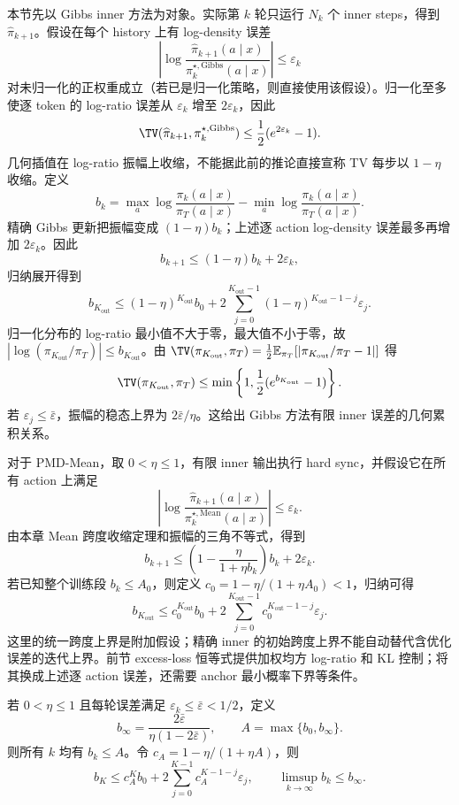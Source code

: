 本节先以 Gibbs inner 方法为对象。实际第 $k$ 轮只运行 $N_k$ 个 inner steps，得到 $\widehat\pi_{k+1}$。假设在每个 history 上有 log-density 误差
\[
 \left|\log\frac{\widehat\pi_{k+1}(a\mid x)}{\pi_k^{\star,\mathrm{Gibbs}}(a\mid x)}\right|\leq\varepsilon_k
\]
对未归一化的正权重成立（若已是归一化策略，则直接使用该假设）。归一化至多使逐 token 的 log-ratio 误差从 $\varepsilon_k$ 增至 $2\varepsilon_k$，因此
\begin{equation}\label{eq:finite-inner-tv}
 \TV(\widehat\pi_{k+1},\pi_k^{\star,\mathrm{Gibbs}})
 \leq \frac12(e^{2\varepsilon_k}-1).
\end{equation}
几何插值在 log-ratio 振幅上收缩，不能据此前的推论直接宣称 TV 每步以 $1-\eta$ 收缩。定义
\[
b_k=\max_a\log\frac{\pi_k(a\mid x)}{\pi_T(a\mid x)}
-\min_a\log\frac{\pi_k(a\mid x)}{\pi_T(a\mid x)}.
\]
精确 Gibbs 更新把振幅变成 $(1-\eta)b_k$；上述逐 action log-density 误差最多再增加 $2\varepsilon_k$。因此
\begin{equation}\label{eq:outer-error-recursion}
b_{k+1}\le(1-\eta)b_k+2\varepsilon_k,
\end{equation}
归纳展开得到
\[
b_{K_{\mathrm{out}}}\le(1-\eta)^{K_{\mathrm{out}}} b_0
+2\sum_{j=0}^{K_{\mathrm{out}}-1}(1-\eta)^{K_{\mathrm{out}}-1-j}\varepsilon_j.
\]
归一化分布的 log-ratio 最小值不大于零，最大值不小于零，故 $|\log(\pi_{K_{\mathrm{out}}}/\pi_T)|\le b_{K_{\mathrm{out}}}$。由 $\TV(\pi_{K_{\mathrm{out}}},\pi_T)=\frac12\mathbb E_{\pi_T}[|\pi_{K_{\mathrm{out}}}/\pi_T-1|]$ 得
\[
\TV(\pi_{K_{\mathrm{out}}},\pi_T)\le\min\left\{1,\frac12(e^{b_{K_{\mathrm{out}}}}-1)\right\}.
\]
若 $\varepsilon_j\le\bar\varepsilon$，振幅的稳态上界为 $2\bar\varepsilon/\eta$。这给出 Gibbs 方法有限 inner 误差的几何累积关系。

对于 PMD-Mean，取 $0<\eta\le1$，有限 inner 输出执行 hard sync，并假设它在所有 action 上满足
\[
\left|\log\frac{\widehat\pi_{k+1}(a\mid x)}
{\pi_k^{\star,\mathrm{Mean}}(a\mid x)}\right|\le\varepsilon_k.
\]
由本章 Mean 跨度收缩定理和振幅的三角不等式，得到
\[
b_{k+1}\le\left(1-\frac{\eta}{1+\eta b_k}\right)b_k+2\varepsilon_k.
\]
若已知整个训练段 $b_k\le A_0$，则定义
$c_0=1-\eta/(1+\eta A_0)<1$，归纳可得
\[
b_{K_{\mathrm{out}}}\le c_0^{K_{\mathrm{out}}}b_0
+2\sum_{j=0}^{K_{\mathrm{out}}-1}c_0^{K_{\mathrm{out}}-1-j}\varepsilon_j.
\]
这里的统一跨度上界是附加假设；精确 inner 的初始跨度上界不能自动替代含优化误差的迭代上界。前节 excess-loss 恒等式提供加权均方 log-ratio 和 KL 控制；将其换成上述逐 action 误差，还需要 anchor 最小概率下界等条件。

\begin{theorem}
若 $0<\eta\leq1$ 且每轮误差满足 $\varepsilon_k\leq\bar\varepsilon<1/2$，定义
\[
 b_\infty=\frac{2\bar\varepsilon}{\eta(1-2\bar\varepsilon)},\qquad
 A=\max\{b_0,b_\infty\}.
\]
则所有 $k$ 均有 $b_k\leq A$。令 $c_A=1-\eta/(1+\eta A)$，则
\[
 b_K\leq c_A^K b_0+
     2\sum_{j=0}^{K-1}c_A^{K-1-j}\varepsilon_j,
 \qquad \limsup_{k\to\infty}b_k\leq b_\infty.
\]
\end{theorem}

